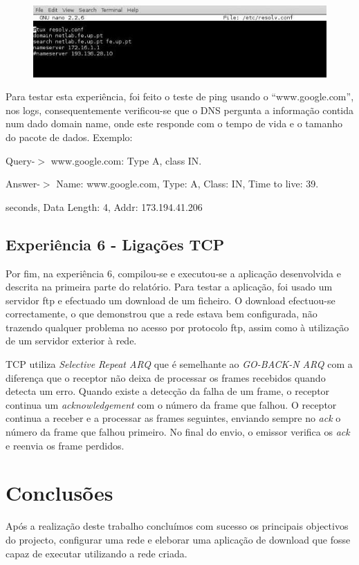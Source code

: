 \documentclass[a4paper]{article}
\begin{document}
\begin{figure}[h!]
\centering
\includegraphics[scale=0.5]{res/image4.jpg}
\end{figure}

Para testar esta experiência, foi feito o teste de ping usando o “www.google.com”, nos logs, consequentemente verificou-se que o DNS pergunta a informação contida num dado domain name, onde este responde com o tempo de vida e o tamanho do pacote de dados.\linebreak
Exemplo:

Query-$>$ www.google.com: Type A, class IN.

Answer-$>$ Name: www.google.com, Type: A, Class: IN, Time to live: 39.

seconds, Data Length: 4, Addr: 173.194.41.206

\subsection{Experiência 6 - Ligações TCP}
Por fim, na experiência 6, compilou-se e executou-se a aplicação desenvolvida e descrita na primeira parte do relatório.
	Para testar a aplicação, foi usado um servidor ftp e efectuado um download de um ficheiro. O download efectuou-se correctamente, o que demonstrou que a rede estava bem configurada, não trazendo qualquer problema no acesso por protocolo ftp, assim como à utilização de um servidor exterior à rede.

	TCP utiliza \textit{Selective Repeat ARQ} que é semelhante ao \textit{GO-BACK-N ARQ} com a diferença que o receptor não deixa de processar os frames recebidos quando detecta um erro. Quando existe a detecção da falha de um frame, o receptor continua um \textit{acknowledgement} com o número da frame que falhou. O receptor continua a receber e a processar as frames seguintes, enviando sempre no \textit{ack} o número da frame que falhou primeiro. No final do envio, o emissor verifica os \textit{ack} e reenvia os frame perdidos.

\section{Conclusões}
Após a realização deste trabalho concluímos com sucesso os principais objectivos do projecto, configurar uma rede e eleborar uma aplicação de download que fosse capaz de executar utilizando a rede criada. 
\end{document}
